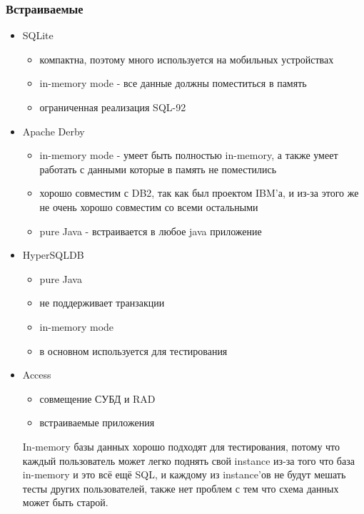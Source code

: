 \subsubsection{Встраиваемые}
\begin{itemize}
    \item SQLite
    \begin{itemize}
        \item компактна, поэтому много используется на мобильных устройствах
        \item in-memory mode - все данные должны поместиться в память
        \item ограниченная реализация SQL-92
    \end{itemize}
    \item Apache Derby
    \begin{itemize}
        \item in-memory mode - умеет быть полностью in-memory, а также умеет работать с данными которые в память не поместились
        \item хорошо совместим с DB2, так как был проектом IBM'а, и из-за этого же не очень хорошо совместим со всеми остальными
        \item pure Java - встраивается в любое java приложение
    \end{itemize}
    \item HyperSQLDB
    \begin{itemize}
        \item pure Java
        \item не поддерживает транзакции
        \item in-memory mode
        \item в основном используется для тестирования
    \end{itemize}
    \item Access
    \begin{itemize}
        \item совмещение СУБД и RAD
        \item встраиваемые приложения
    \end{itemize}
    \begin{remark}
        In-memory базы данных хорошо подходят для тестирования, потому что каждый пользователь может легко поднять свой instance из-за того что база in-memory и это всё ещё SQL, и каждому из instance'ов не будут мешать тесты других пользователей, также нет проблем с тем что схема данных может быть старой.
    \end{remark}
\end{itemize}